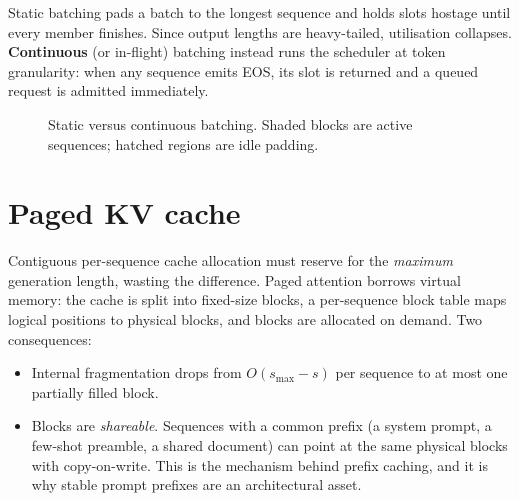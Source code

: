 \documentclass[11pt,twoside,openright]{book}
\theoremstyle{definition}
\theoremstyle{plain}
\theoremstyle{remark}
\newcommand{\term}[1]{\textbf{#1}}
\begin{document}
Static batching pads a batch to the longest sequence and holds slots hostage
until every member finishes. Since output lengths are heavy-tailed, utilisation
collapses. \term{Continuous} (or in-flight) batching instead runs the scheduler
at token granularity: when any sequence emits EOS, its slot is returned and a
queued request is admitted immediately.

\begin{figure}[H]
\centering
{}
\caption{Static versus continuous batching. Shaded blocks are active sequences;
hatched regions are idle padding.}
\label{fig:batching}
\end{figure}

\section{Paged KV cache}

Contiguous per-sequence cache allocation must reserve for the \emph{maximum}
generation length, wasting the difference. Paged attention borrows virtual
memory: the cache is split into fixed-size blocks, a per-sequence block table
maps logical positions to physical blocks, and blocks are allocated on demand.
Two consequences:

\begin{itemize}[leftmargin=1.4em]
  \item Internal fragmentation drops from $O(s_{\max}-s)$ per sequence to at most
        one partially filled block.
  \item Blocks are \emph{shareable}. Sequences with a common prefix (a system
        prompt, a few-shot preamble, a shared document) can point at the same
        physical blocks with copy-on-write. This is the mechanism behind prefix
        caching, and it is why stable prompt prefixes are an architectural asset.
\end{itemize}
\end{document}
